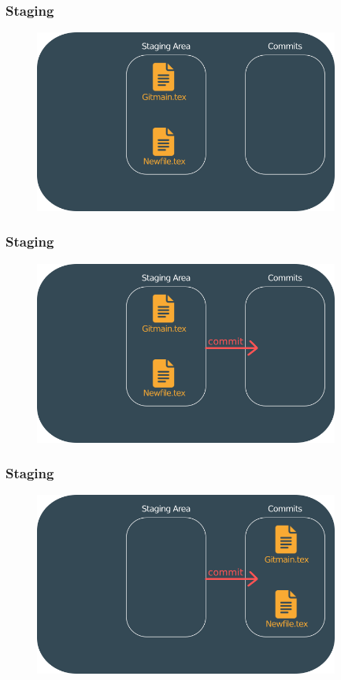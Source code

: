 \documentclass{beamer}
\begin{document}
	\begin{frame}
		\frametitle{Staging}
		\begin{figure}[htbp]
			\centering
			\includegraphics[width=10cm]{staging9}
		\end{figure}
	\end{frame}
	
	\begin{frame}
		\frametitle{Staging}
		\begin{figure}[htbp]
			\centering
			\includegraphics[width=10cm]{staging10}
		\end{figure}
	\end{frame}
	
	\begin{frame}
		\frametitle{Staging}
		\begin{figure}[htbp]
			\centering
			\includegraphics[width=10cm]{staging11}
		\end{figure}
	\end{frame}
	
\end{document}
